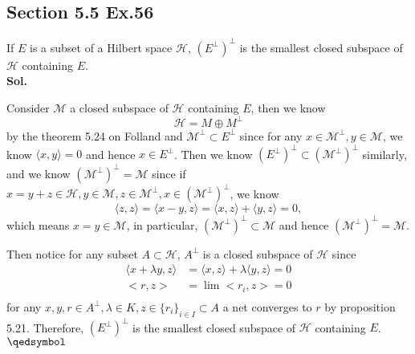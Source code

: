 \documentclass[lang=en,11pt,a4paper,citestyle =authoryear]{elegantpaper}
\newcommand{\prvd}{$\hfill \qedsymbol$}
\newcommand{\M}{\mathcal{M}}
\newcommand{\Hil}{\mathcal{H}}
\begin{document}
\subsection*{Section 5.5 Ex.56} 
If $E$ is a subset of a Hilbert space $\Hil$, $(E^{\perp})^{\perp}$ is the smallest closed subspace of $\Hil$ containing $E$.
\vspace{0.5em}\\
\textbf{Sol.} \par
Consider $\M$ a closed subspace of $\Hil$ containing $E$, then we know 
\[\Hil = M \oplus M^{\perp}\]
by the theorem 5.24 on Folland and $\M^{\perp} \subset E^{\perp}$ since for any $x\in \M^{\perp}, y\in \M$, we know $\langle x,y\rangle = 0$ and hence $x\in E^{\perp}$. Then we know $(E^{\perp})^{\perp} \subset (\M^{\perp})^{\perp}$ similarly, and we know $(\M^{\perp})^{\perp} = \M$ since if $x= y+z \in \Hil, y\in \M, z\in\M^{\perp}, x\in (\M^{\perp})^{\perp}$, we know
\[\langle z,z\rangle = \langle x-y,z\rangle = \langle x,z\rangle + \langle y,z\rangle = 0,\]
which means $x = y \in \M$, in particular, $(\M^{\perp})^{\perp} \subset \M$ and hence $(\M^{\perp})^{\perp} = \M$.\par
Then notice for any subset $A\subset\Hil$, $A^{\perp}$ is a closed subspace of $\Hil$ since
\[
\begin{aligned}
\langle x+\lambda y,z\rangle &= \langle x,z\rangle +\lambda\langle y,z\rangle = 0 \\
<r,z> &= \lim <r_{i}, z> = 0 \\
\end{aligned}
\] 
for any $x,y,r\in A^{\perp}, \lambda \in K, z\in \{r_{i}\}_{i\in I}\subset A$ a net converges to $r$ by proposition 5.21. Therefore, $(E^{\perp})^{\perp}$ is the smallest closed subspace of $\Hil$ containing $E$.
\prvd
\vspace{0.5em}
\end{document}
